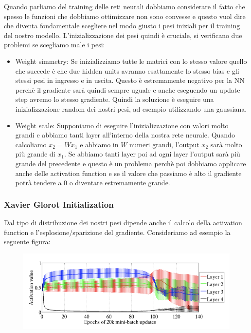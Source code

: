 \documentclass[14pt]{extreport}
\begin{document}
Quando parliamo del training delle reti neurali dobbiamo considerare il fatto che spesso le funzioni che dobbiamo ottimizzare non sono convesse e
questo vuol dire che diventa fondamentale scegliere nel modo giusto i pesi iniziali per il training del nostro modello. L'inizializzazione dei pesi
quindi è cruciale, si verificano due problemi se scegliamo male i pesi:
\begin{itemize}
	\item Weight simmetry: Se inizializziamo tutte le matrici con lo stesso valore quello che succede è che due hidden units avranno esattamente lo
	      stesso bias e gli stessi pesi in ingresso e in uscita. Questo è estremamente negativo per la NN perchè il gradiente sarà quindi sempre
	      uguale e anche eseguendo un update step avremo lo stesso gradiente. Quindi la soluzione è eseguire una inizializzazione random dei nostri
	      pesi, ad esempio utilizzando una gaussiana.
	\item Weight scale: Supponiamo di eseguire l'inizializzazione con valori molto grandi e abbiamo tanti layer all'interno della nostra rete neurale.
	      Quando calcoliamo $x_2 = Wx_1$ e abbiamo in $W$ numeri grandi, l'output $x_2$ sarà molto più grande di $x_1$. Se abbiamo tanti layer poi ad
	      ogni layer l'output sarà più grande del precedente e questo è un problema perchè poi dobbiamo applicare anche delle activation function e se
	      il valore che passiamo è alto il gradiente potrà tendere a 0 o diventare estremamente grande.
\end{itemize}

\subsubsection{Xavier Glorot Initialization}

Dal tipo di distribuzione dei nostri pesi dipende anche il calcolo della activation function e l'esplosione/sparizione del gradiente. Consideriamo ad
esempio la seguente figura:

\begin{figure}[H]
	\centering
	\includegraphics[width=0.7\linewidth]{423.jpeg}
\end{figure}
\end{document}
